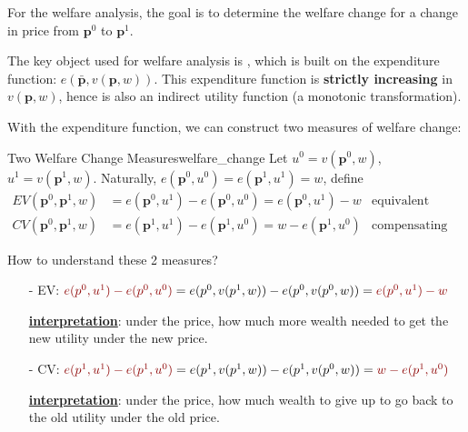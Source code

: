 For the welfare analysis, the goal is to determine the welfare change for a change in price from $\mathbf{p}^0$ to $\mathbf{p}^1$.

The key object used for welfare analysis is , which is built on the expenditure function: $e(\bar{\mathbf{p}},v(\mathbf{p},w))$. This expenditure function is \textbf{strictly increasing} in $v(\mathbf{p},w)$, hence is also an indirect utility function (a monotonic transformation).

With the expenditure function, we can construct two measures of welfare change:
\begin{definition}{Two Welfare Change Measures}{welfare_change}
    Let $u^0 = v(\mathbf{p}^0,w)$, $u^1 = v(\mathbf{p}^1,w)$. Naturally, $e(\mathbf{p}^0,u^0)=e(\mathbf{p}^1,u^1)=w$, define
    \begin{align*}
        EV(\mathbf{p}^0,\mathbf{p}^1,w) &=e(\mathbf{p}^0,u^1)-e(\mathbf{p}^0,u^0)=e(\mathbf{p}^0,u^1)-w & \text{equivalent variation}\\
        CV(\mathbf{p}^0,\mathbf{p}^1,w) &=e(\mathbf{p}^1,u^1)-e(\mathbf{p}^1,u^0)=w-e(\mathbf{p}^1,u^0) & \text{compensating variation}
    \end{align*}
\end{definition}

How to understand these 2 measures?

\begin{itemize}
    \item[-] EV: ${\color{red!55!black}e(p^0,u^1)-e(p^0,u^0)} = e(p^0,v(p^1,w))-e(p^0,v(p^0,w)) = {\color{red!55!black}e(p^0,u^1)-w}$
    
    \underline{\textbf{interpretation}}: under the  price, how much more wealth needed to get the new utility under the new price.
    
    \item[-] CV: ${\color{red!55!black}e(p^1,u^1)-e(p^1,u^0)} = e(p^1,v(p^1,w))-e(p^1,v(p^0,w)) = {\color{red!55!black}w- e(p^1,u^0)}$
    
    \underline{\textbf{interpretation}}: under the  price, how much wealth to give up to go back to the old utility under the old price.
\end{itemize}